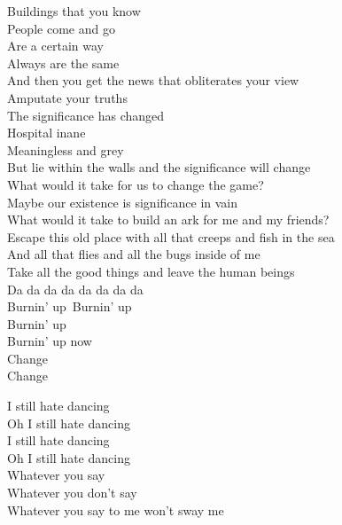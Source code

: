 Buildings that you know\\
People come and go\\
Are a certain way\\
Always are the same\\
And then you get the news that obliterates your view\\
Amputate your truths\\
The significance has changed\\

Hospital inane\\
Meaningless and grey\\
But lie within the walls and the significance will change\\
What would it take for us to change the game?\\
Maybe our existence is significance in vain\\

What would it take to build an ark for me and my friends?\\
Escape this old place with all that creeps and fish in the sea\\
And all that flies and all the bugs inside of me\\
Take all the good things and leave the human beings\\

Da da da da da da da da\\

Burnin' up\
Burnin' up\\
Burnin' up\\
Burnin' up now\\

Change\\
Change\\




I still hate dancing\\
Oh I still hate dancing\\
I still hate dancing\\
Oh I still hate dancing\\

Whatever you say\\
Whatever you don't say\\
Whatever you say to me won't sway me\\

